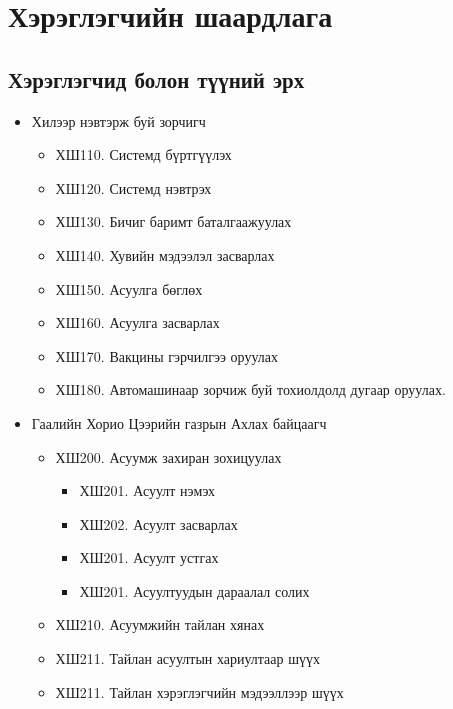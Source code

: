 \section{Хэрэглэгчийн шаардлага} 

\subsection{Хэрэглэгчид болон түүний эрх} 
\begin{itemize}
	\item Хилээр нэвтэрж буй зорчигч
	\begin{itemize}
	    \item ХШ110. Системд бүртгүүлэх  
	    \item ХШ120. Системд нэвтрэх 
	    \item ХШ130. Бичиг баримт баталгаажуулах 
            \item ХШ140. Хувийн мэдээлэл засварлах 
            \item ХШ150. Асуулга бөглөх
            \item ХШ160. Асуулга засварлах 
            \item ХШ170. Вакцины гэрчилгээ оруулах
            \item ХШ180. Автомашинаар зорчиж буй тохиолдолд дугаар оруулах. 
	\end{itemize}

        \item Гаалийн Хорио Цээрийн газрын Ахлах байцаагч
	\begin{itemize}
	    \item ХШ200. Асуумж захиран зохицуулах
                \begin{itemize}
                    \item ХШ201. Асуулт нэмэх
                    \item ХШ202. Асуулт засварлах
                    \item ХШ201. Асуулт устгах
                    \item ХШ201. Асуултуудын дараалал солих
                \end{itemize}
	    \item ХШ210. Асуумжийн тайлан хянах
                \item ХШ211. Тайлан асуултын хариултаар шүүх 
                \item ХШ211. Тайлан хэрэглэгчийн мэдээллээр шүүх 
	\end{itemize}
        

\end{itemize}
